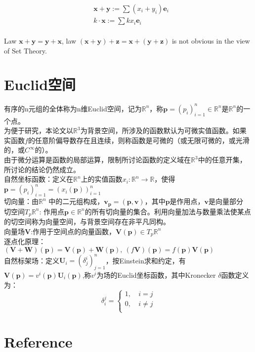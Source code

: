 \documentclass[UTF8]{../09-Mathematics}
\begin{document}
\begin{equation}
    \begin{split}
    & \boldsymbol x + \boldsymbol y := \sum (x_i + y_i)\boldsymbol e_i\\
    & k \cdot \boldsymbol x := \sum kx_i\boldsymbol e_i\\
\end{split}
\end{equation}

Law $\boldsymbol{x} + \boldsymbol{y} = \boldsymbol{y} + \boldsymbol{x}$,
law $ (\boldsymbol{x} + \boldsymbol{y} )+ \boldsymbol{z} = \boldsymbol{x} +( \boldsymbol{y} + \boldsymbol{z})$ is not obvious in the view of Set Theory.




\section{Euclid空间}
有序的n元组的全体称为n维Euclid空间，记为$\mathbb R^n$，称$\boldsymbol p=(p_i)_{i=1}^n \in \mathbb R^n$是$\mathbb R^n$的一个点。\\
为便于研究，本论文以$ \mathbb R^3$为背景空间，所涉及的函数默认为可微实值函数。如果实函数$f$的任意阶偏导数存在且连续，则称函数是可微的（或无限可微的，或光滑的，或$C^\infty$的）。\\
由于微分运算是函数的局部运算，限制所讨论函数的定义域在$ \mathbb R^3$中的任意开集，所讨论的结论仍然成立。\\
自然坐标函数：定义在$\mathbb R^n$上的实值函数$x_i: \mathbb R^n \to  \mathbb R$，使得$\boldsymbol p=(p_i)_{i=1}^n = \left( x_i(\boldsymbol p) \right)_{i=1}^n   $\\
切向量：由$\mathbb R^n$ 中的二元组构成，$\boldsymbol v_{\boldsymbol p}=(\boldsymbol p,\boldsymbol v)$，其中$\boldsymbol p$是作用点，$\boldsymbol v$是向量部分\\
切空间$T_p  \mathbb R^n$: 作用点$\boldsymbol p \in \mathbb R^n$的所有切向量的集合。利用向量加法与数量乘法使某点的切空间称为向量空间，与背景空间存在非平凡同构。\\
向量场$\boldsymbol V$:作用于空间点的向量函数，$\boldsymbol V(\boldsymbol p)\in T_p  \mathbb R^n $\\
逐点化原理：$(\boldsymbol V+\boldsymbol W)(\boldsymbol p)=\boldsymbol V(\boldsymbol p)+\boldsymbol W(\boldsymbol p),\ (f \boldsymbol V)(\boldsymbol p)= f(\boldsymbol p)\boldsymbol V (\boldsymbol p)$\\
自然标架场：定义$\boldsymbol U_i=(\delta _j^i)_{j=1}^n$，按Einstein求和约定，有$\boldsymbol V(\boldsymbol p)=v^i(\boldsymbol p)\boldsymbol U_i(\boldsymbol p)$,称$v^i$为场的Euclid坐标函数，其中Kronecker $\delta$函数定义为：
\begin{equation}
\label{Kronecker_delta}
\delta _i^j=\left\{ 
    \begin{aligned}
    1,\  & i =j\\
    0,\  & i \neq j\\
    \end{aligned}
     \right.
\end{equation}

\section{Reference}
\end{document}
